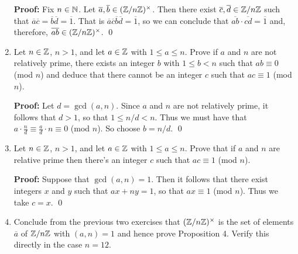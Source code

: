 \begin{enumerate}
      \textbf{Proof:} Fix $n \in \mathbb{N}$. Let
      $\overline{a}, \overline{b} \in (\mathbb{Z}/n\mathbb{Z})^\times$. Then there exist
      $\overline{c}, \overline{d} \in \mathbb{Z}/n\mathbb{Z}$ such that
      $\overline{a}\overline{c} = \overline{b}\overline{d} = \overline{1}$. That
      is $\overline{a}\overline{c}\overline{b}\overline{d} = \overline{1}$, so
      we can conclude that $\overline{ab}\cdot\overline{cd} = \overline{1}$ and,
      therefore, $\overline{ab} \in (\mathbb{Z}/n\mathbb{Z})^\times$. \qed
   \item[0.3.12]  Let $n \in \mathbb{Z}$, $n > 1$, and let $a \in \mathbb{Z}$ with
                  $1 \le a \le n$. Prove if $a$ and $n$ are not relatively
                  prime, there exists an integer $b$ with $1 \le b < n$ such
                  that $ab \equiv 0$ (mod $n$) and deduce that there cannot be
                  an integer $c$ such that $ac \equiv 1$ (mod $n$).

      \textbf{Proof:} Let $d = \gcd(a, n)$. Since $a$ and $n$ are not relatively
      prime, it follows that $d > 1$, so that $1 \le n/d < n$. Thus we must have 
      that $a \cdot \frac{n}{d} \equiv \frac{a}{d} \cdot n \equiv 0$ (mod $n$).
      So choose $b = n/d$. \qed
   \item[0.3.13]  Let $n \in \mathbb{Z}$, $n > 1$, and let $a \in \mathbb{Z}$ with
                  $1 \le a \le n$. Prove that if $a$ and $n$ are relative prime
                  then there's an integer $c$ such that $ac \equiv 1$ (mod $n$).

      \textbf{Proof:} Suppose that $\gcd(a, n) = 1$. Then it follows that there
      exist integers $x$ and $y$ such that $ax + ny = 1$, so that
      $ax \equiv 1$ (mod $n$). Thus we take $c = x$. \qed
   \item[0.3.14]  Conclude from the previous two exercises that
                  $(\mathbb{Z}/n\mathbb{Z})^\times$ is the set of elements $\overline{a}$ of
                  $\mathbb{Z}/n\mathbb{Z}$ with $(a, n) = 1$ and hence prove Proposition 4.
                  Verify this directly in the case $n = 12$.


\end{enumerate}
